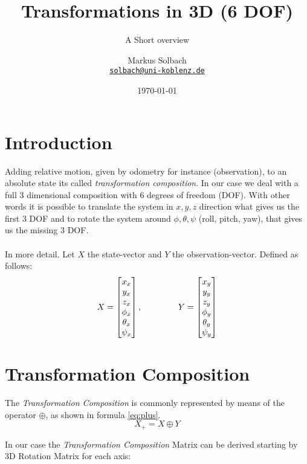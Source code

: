 \documentclass[10pt,a4paper]{scrartcl}
\author{Markus Solbach \\ \href{mailto:solbach@uni-koblenz.de}{\texttt{solbach@uni-koblenz.de}}}
\date{\today}
\begin{document}
\title{Transformations in 3D (6 DOF)}
\subtitle{A Short overview}
\maketitle
\newpage

\section{Introduction}\label{ch:intro}
Adding relative motion, given by odometry for instance (observation), to an absolute state its called \textit{transformation composition}. In our case we deal with a full 3 dimensional composition with 6 degrees of freedom (DOF). With other words it is possible to translate the system in $x, y, z$ direction what gives us the first 3 DOF and to rotate the system around $\phi, \theta, \psi$ (roll, pitch, yaw), that gives us the missing 3 DOF.
\\\\ In more detail. Let $X$ the state-vector and $Y$ the observation-vector. Defined as follows:
\begin{equation}
X = \begin{bmatrix} x_x \\ y_x \\ z_x \\ \phi_x \\ \theta_x \\ \psi_x \end{bmatrix}, \hspace{15 mm} Y = \begin{bmatrix} x_y \\ y_y \\ z_y \\ \phi_y \\ \theta_y \\ \psi_y \end{bmatrix}
\end{equation}


\section{Transformation Composition}
The \textit{Transformation Composition} is commonly represented by means of the operator $\oplus$, as shown in formula \ref{eq:plus}.
\begin{equation}\label{eq:plus}
X_+ = X \oplus Y
\end{equation}

In our case the \textit{Transformation Composition} Matrix can be derived starting by 3D Rotation Matrix for each axis:
\end{document}
